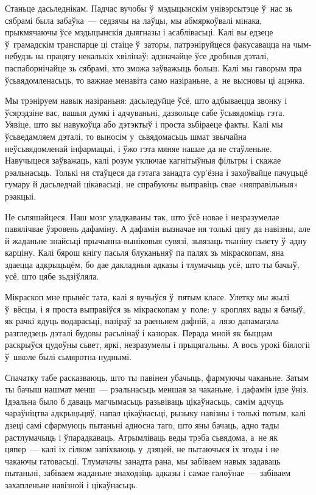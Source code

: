 Станьце дасьледнікам. Падчас вучобы ў~мэдыцынскім унівэрсытэце ў~нас зь сябрамі была забаўка~--- седзячы на лаўцы, мы абмяркоўвалі мінака, прыкмячаючы ўсе мэдыцынскія дыягназы і асаблівасьці. Калі вы едзеце ў~грамадскім транспарце ці стаіце ў~заторы, патрэніруйцеся факусавацца на чым-небудзь на працягу некалькіх хвілінаў: адзначайце ўсе дробныя дэталі, паспаборнічайце зь сябрамі, хто зможа заўважыць больш. Калі мы гаворым пра ўсьвядомленасьць, то важнае менавіта само назіраньне, а~не высновы ці ацэнка.

Мы трэніруем навык назіраньня: дасьледуйце ўсё, што адбываецца звонку і ўсярэдзіне вас, вашыя думкі і адчуваньні, дазвольце сабе ўсьвядоміць гэта. Уявіце, што вы навукоўца або дэтэктыў і проста зьбіраеце факты. Калі мы ўсьведамляем дэталі, то выносім у~сьвядомасьць шмат звычайна неўсьвядомленай інфармацыі, і ўжо гэта мяняе нашае да яе стаўленьне. Навучыцеся заўважаць, калі розум уключае кагнітыўныя фільтры і скажае рэальнасьць. Толькі ня стаўцеся да гэтага занадта сур'ёзна і захоўвайце пачуцьцё гумару й дасьледчай цікавасьці, не спрабуючы выправіць свае «няправільныя» рэакцыі.

Не сьпяшайцеся. Наш мозг уладкаваны так, што ўсё новае і незразумелае павялічвае ўзровень дафаміну. А дафамін вызначае ня толькі цягу да навізны, але й жаданьне знайсьці прычынна-выніковыя сувязі, зьвязаць тканіну сьвету ў~адну карціну. Калі бярош кнігу пасьля блуканьняў па палях зь мікраскопам, яна здаецца адкрыцьцём, бо дае дакладныя адказы і тлумачыць усё, што ты бачыў, усё, што цябе зьдзіўляла. 

Мікраскоп мне прынёс тата, калі я вучыўся ў~пятым класе. Улетку мы жылі ў~вёсцы, і я проста выправіўся зь мікраскопам у~поле: у~кроплях вады я бачыў, як рачкі ядуць водарасьці, назіраў за раеньнем дафній, а~лязо дапамагала разгледзець дэталі будовы расьлінаў і казюрак. Перада мной як быццам раскрыўся цудоўны сьвет, яркі, незразумелы і прыцягальны. А вось урокі біялогіі ў~школе былі сьмяротна нуднымі.

Спачатку табе расказваюць, што ты павінен убачыць, фармуючы чаканьне. Затым ты бачыш нашмат менш~--- рэальнасьць меншая за чаканьне, і дафамін ідзе ўніз. Ідэальна было б даваць магчымасьць разьвіваць цікаўнасьць, самім адчуць чараўніцтва адкрыцьцяў, напал цікаўнасьці, рызыку навізны і толькі потым, калі дзеці самі сфармуюць пытаньні адносна таго, што яны бачаць, адно тады растлумачыць і ўпарадкаваць. Атрымліваць веды трэба сьвядома, а~не як цяпер~--- калі іх сілком запіхваюць у~дзяцей, не пытаючыся іх згоды і не чакаючы гатовасьці. Тлумачачы занадта рана, мы забіваем навык задаваць пытаньні, забіваем жаданьне знаходзіць адказы і самае галоўнае~--- забіваем захапленьне навізной і цікаўнасьць.

